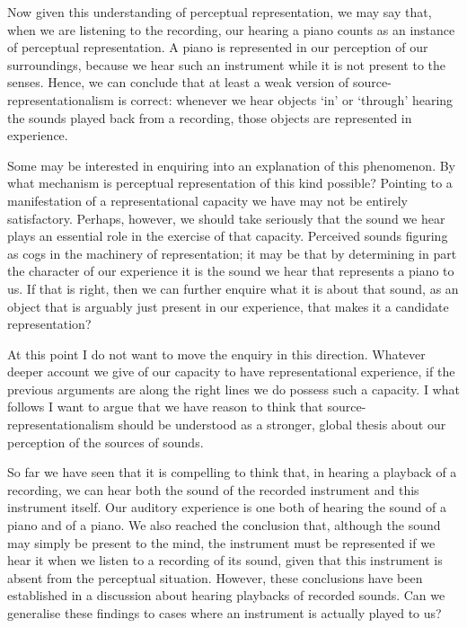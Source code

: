 \documentclass[sloppy, journal, git, bytitle, dodraft]{humapap}
\begin{document}
Now given this understanding of perceptual representation, we may say that, when we are listening to the recording, our hearing a piano counts as an instance of perceptual representation. A piano is represented in our perception of our surroundings, because we hear such an instrument while it is not present to the senses. Hence, we can conclude that at least a weak version of source-representationalism is correct: whenever we hear objects `in' or `through' hearing the sounds played back from a recording, those objects are  represented in experience. 

Some may be interested in enquiring into an explanation of this phenomenon. By what mechanism is perceptual representation of this kind possible? Pointing to a manifestation of a representational capacity we have may not be entirely satisfactory. Perhaps, however, we should take seriously that the sound we hear plays an essential role in the exercise of that capacity. Perceived sounds figuring as cogs in the machinery of representation; it may be that by determining in part the character of our experience it is the sound we hear that represents a piano to us. If that is right, then we can further enquire what it is about that sound, as an object that is arguably just present in our experience, that makes it a candidate representation? 

At this point I do not want to move the enquiry in this direction. Whatever deeper account we give of our capacity to have representational experience, if the previous arguments are along the right lines we do possess such a capacity. I what follows I want to argue that we have reason to think that source-representationalism should be understood as a stronger, global thesis about our perception of the sources of sounds. 


\sect So far we have seen that it is compelling to think that, in hearing a playback of a recording, we can hear both the sound of the recorded instrument and this instrument itself. Our auditory experience is one both of hearing the sound of a piano and of a piano. We also reached the conclusion that, although the sound may simply be present to the mind, the instrument must be represented if we hear it when we listen to a recording of its sound, given that this instrument is absent from the perceptual situation. However, these conclusions have been established in a discussion about hearing playbacks of recorded sounds. Can we generalise these findings to cases where an instrument is actually played to us? 
\end{document}
